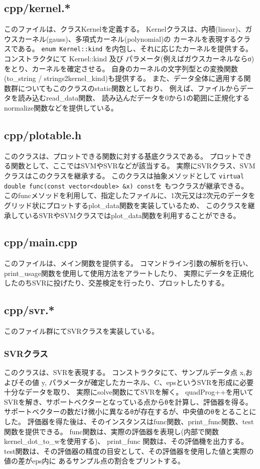 \documentclass[]{jsarticle}
\begin{document}
\subsection{cpp/kernel.*}
このファイルは、クラスKernelを定義する。
Kernelクラスは、内積(linear)、ガウスカーネル(gauss)、多項式カーネル(polynomial)の
カーネルを表現するクラスである。
\verb|enum Kernel::kind| を内包し、それに応じたカーネルを提供する。
コンストラクタにて Kernel::kind 及び パラメータ(例えばガウスカーネルならσ)をとり、カーネルを確定させる。
自身のカーネルの文字列型との変換関数(to\_string / strings2kernel\_kind)も提供する。
また、データ全体に適用する関数群についてもこのクラスのstatic関数としており、
例えば、ファイルからデータを読み込むread\_data関数、
読み込んだデータを0から1の範囲に正規化するnormalize関数などを提供している。


\subsection{cpp/plotable.h}
このクラスは、プロットできる関数に対する基底クラスである。
プロットできる関数として、ここではSVMやSVRなどが該当する。
実際にSVRクラス、SVMクラスはこのクラスを継承する。
このクラスは抽象メソッドとして
\verb|virtual double func(const vector<double> &x) const|を
もつクラスが継承できる。
このfuncメソッドを利用して、指定したファイルに、1次元又は2次元のデータを
グリッド状にプロットするplot\_data関数を実装しているため、
このクラスを継承しているSVRやSVMクラスではplot\_data関数を利用することができる。

\subsection{cpp/main.cpp}
このファイルは、メイン関数を提供する。
コマンドライン引数の解析を行い、print\_usage関数を使用して使用方法をアラートしたり、
実際にデータを正規化したのちSVRに投げたり、交差検定を行ったり、プロットしたりする。

\subsection{cpp/svr.*}
このファイル群にてSVRクラスを実装している。
\subsubsection{SVRクラス}
このクラスは、SVRを表現する。
コンストラクタにて、サンプルデータ点 x,およびその値 y,
パラメータが確定したカーネル、C、epsというSVRを形成に必要十分なデータを取り、
実際にsolve関数にてSVRを解く。
quadProg++を用いてSVRを解き、サポートベクターとなっている点からθを計算し、評価器を得る。
サポートベクターの数だけ微小に異なるθが存在するが、中央値のθをとることにした。
評価器を得た後は、そのインスタンスはfunc関数、print\_func関数、test関数を提供できる。
func関数は、実際の評価器を表現し(内部で関数kernel\_dot\_to\_wを使用する)、
print\_func 関数は、その評価機を出力する。
test関数は、その評価器の精度の目安として、その評価器を使用した値と実際の値の差がeps内に
あるサンプル点の割合をプリントする。
\end{document}
